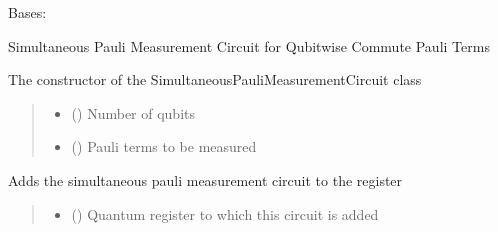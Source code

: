 \documentclass[letterpaper,10pt,english]{sphinxmanual}
\begin{document}
\begin{fulllineitems}
\label{\detokenize{qcompute_qapp.circuit:qcompute_qapp.circuit.SimultaneousPauliMeasurementCircuit}}
\pysigstartsignatures
{}
\pysigstopsignatures
\sphinxAtStartPar
Bases: {\hyperref[\detokenize{qcompute_qapp.circuit:qcompute_qapp.circuit.BasicCircuit}]{}}

\sphinxAtStartPar
Simultaneous Pauli Measurement Circuit for Qubitwise Commute Pauli Terms

\sphinxAtStartPar
The constructor of the SimultaneousPauliMeasurementCircuit class
\begin{quote}\begin{description}
\begin{itemize}
\item {} 
\sphinxAtStartPar
{} () \textendash{} Number of qubits

\item {} 
\sphinxAtStartPar
{} () \textendash{} Pauli terms to be measured

\end{itemize}

\end{description}\end{quote}

\begin{fulllineitems}
\label{\detokenize{qcompute_qapp.circuit:qcompute_qapp.circuit.SimultaneousPauliMeasurementCircuit.add_circuit}}
\pysigstartsignatures
{}
\pysigstopsignatures
\sphinxAtStartPar
Adds the simultaneous pauli measurement circuit to the register
\begin{quote}\begin{description}
\begin{itemize}
\item {} 
\sphinxAtStartPar
{} () \textendash{} Quantum register to which this circuit is added


\end{itemize}
\end{description}
\end{quote}
\end{fulllineitems}
\end{fulllineitems}
\end{document}
